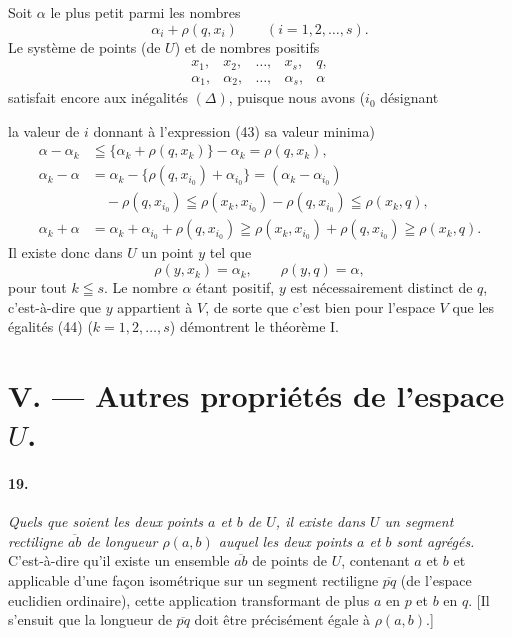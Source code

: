 \documentclass[a4paper,12pt]{amsart}
\newcommand{\srcpage}[1]{} %
\begin{document}
Soit $\alpha$ le plus petit parmi les nombres
\begin{equation}\tag{43}
\alpha_i+\rho(q,x_i)\qquad(i=1,2,\dots,s).
\end{equation}
Le système de points (de $U$) et de nombres positifs
\[
\begin{array}{ccccc}
x_1,&x_2,&\dots,&x_s,&q,\\
\alpha_1,&\alpha_2,&\dots,&\alpha_s,&\alpha
\end{array}
\]
satisfait encore aux inégalités $(\Delta)$, puisque nous avons ($i_0$ désignant
\srcpage{81}
la valeur de $i$ donnant à l'expression (43) sa valeur minima)
\[
\begin{aligned}
\alpha-\alpha_k&\leqq\{\alpha_k+\rho(q,x_k)\}-\alpha_k=\rho(q,x_k),\\
\alpha_k-\alpha&=\alpha_k-\{\rho(q,x_{i_0})+\alpha_{i_0}\}=(\alpha_k-\alpha_{i_0})\\
&\quad-\rho(q,x_{i_0})\leqq\rho(x_k,x_{i_0})-\rho(q,x_{i_0})\leqq\rho(x_k,q),\\
\alpha_k+\alpha&=\alpha_k+\alpha_{i_0}+\rho(q,x_{i_0})\geqq\rho(x_k,x_{i_0})+\rho(q,x_{i_0})\geqq\rho(x_k,q).
\end{aligned}
\]
Il existe donc dans $U$ un point $y$ tel que
\begin{equation}\tag{44}
\rho(y,x_k)=\alpha_k,\qquad\rho(y,q)=\alpha,
\end{equation}
pour tout $k\leqq s$. Le nombre $\alpha$ étant positif, $y$ est nécessairement distinct de $q$, c'est-à-dire que $y$ appartient à $V$, de sorte que c'est bien pour l'espace $V$ que les égalités (44) ($k=1,2,\dots,s$) démontrent le théorème I.

\section*{V. --- Autres propriétés de l'espace $U$.}
\paragraph{19.}
\textit{Quels que soient les deux points $a$ et $b$ de $U$, il existe dans $U$ un segment rectiligne $\overline{ab}$ de longueur $\rho(a,b)$ auquel les deux points $a$ et $b$ sont agrégés.} C'est-à-dire qu'il existe un ensemble $\overline{ab}$ de points de $U$, contenant $a$ et $b$ et applicable d'une façon isométrique sur un segment rectiligne $\overline{pq}$ (de l'espace euclidien ordinaire), cette application transformant de plus $a$ en $p$ et $b$ en $q$. [Il s'ensuit que la longueur de $\overline{pq}$ doit être précisément égale à $\rho(a,b)$.]
\end{document}
